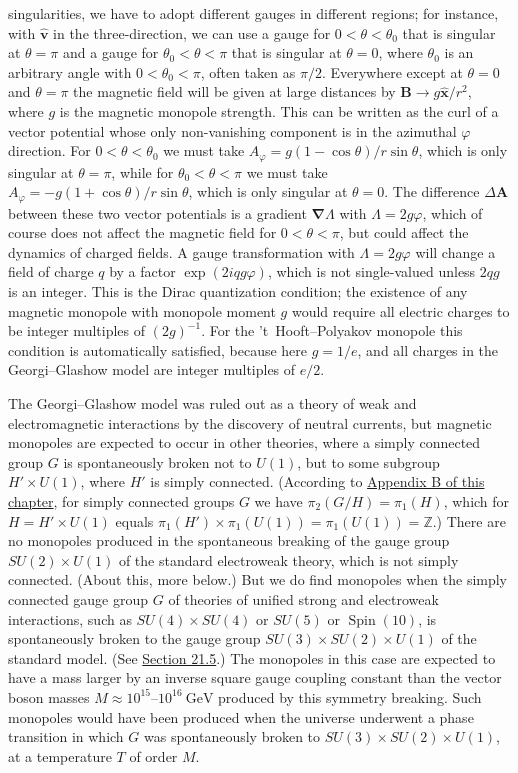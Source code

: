 singularities, we have to adopt different gauges in different regions; for
instance, with $\hat{\mathbf v}$ in the three-direction, we can use a gauge
for $0<\theta<\theta_0$ that is singular at $\theta=\pi$ and a gauge for
$\theta_0<\theta<\pi$ that is singular at $\theta=0$, where $\theta_0$ is
an arbitrary angle with $0<\theta_0<\pi$, often taken as $\pi/2$.
Everywhere except at $\theta=0$ and $\theta=\pi$ the magnetic field will
be given at large distances by
$\mathbf B\to g\hat{\mathbf x}/r^2$, where $g$ is the magnetic monopole
strength. This can be written as the curl of a vector potential whose only
non-vanishing component is in the azimuthal $\varphi$ direction. For
$0<\theta<\theta_0$ we must take
$A_\varphi=g(1-\cos\theta)/r\sin\theta$, which is only singular at
$\theta=\pi$, while for $\theta_0<\theta<\pi$ we must take
$A_\varphi=-g(1+\cos\theta)/r\sin\theta$, which is only singular at
$\theta=0$. The difference $\Delta\mathbf A$ between these two vector
potentials is a gradient $\boldsymbol\nabla\Lambda$ with
$\Lambda=2g\varphi$, which of course does not affect the magnetic field
for $0<\theta<\pi$, but could affect the dynamics of charged fields. A
gauge transformation with $\Lambda=2g\varphi$ will change a field of
charge $q$ by a factor $\exp(2iqg\varphi)$, which is not single-valued
unless $2qg$ is an integer. This is the Dirac quantization condition; the
existence of any magnetic monopole with monopole moment $g$ would require
all electric charges to be integer multiples of $(2g)^{-1}$. For the
't~Hooft--Polyakov monopole this condition is automatically satisfied,
because here $g=1/e$, and all charges in the Georgi--Glashow model are
integer multiples of $e/2$.

The Georgi--Glashow model was ruled out as a theory of weak and
electromagnetic interactions by the discovery of neutral currents, but
magnetic monopoles are expected to occur in other theories, where a simply
connected group $G$ is spontaneously broken not to $U(1)$, but to some
subgroup $H'\times U(1)$, where $H'$ is simply connected. (According to
\hyperref[app:23.B]{Appendix B of this chapter}, for simply connected
groups $G$ we have $\pi_2(G/H)=\pi_1(H)$, which for
$H=H'\times U(1)$ equals
$\pi_1(H')\times\pi_1(U(1))=\pi_1(U(1))=\mathbb Z$.) There are no
monopoles produced in the spontaneous breaking of the gauge group
$SU(2)\times U(1)$ of the standard electroweak theory, which is not simply
connected. (About this, more below.) But we do find monopoles when the
simply connected gauge group $G$ of theories of unified strong and
electroweak interactions, such as $SU(4)\times SU(4)$ or $SU(5)$ or
$\operatorname{Spin}(10)$, is spontaneously broken to the gauge group
$SU(3)\times SU(2)\times U(1)$ of the standard model. (See
\hyperref[sec:21.5]{Section 21.5}.) The monopoles in this case are expected
to have a mass larger by an inverse square gauge coupling constant than
the vector boson masses $M\approx10^{15}$--$10^{16}\ \mathrm{GeV}$
produced by this symmetry breaking. Such monopoles would have been
produced when the universe underwent a phase transition in which $G$ was
spontaneously broken to $SU(3)\times SU(2)\times U(1)$, at a temperature
$T$ of order $M$.

